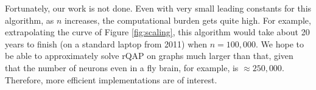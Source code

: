 \documentclass[10pt,journal,cspaper,compsoc]{IEEEtran}
\begin{document}
Fortunately, our work is not done. Even with very small leading constants for this algorithm, as $n$ increases, the computational burden gets quite high.  For example, extrapolating the curve of Figure \ref{fig:scaling}, this algorithm would take about 20 years to finish (on a standard laptop from 2011) when $n=100,000$.  We hope to be able to approximately solve rQAP on graphs much larger than that, given that the number of neurons even in a fly brain, for example, is $\approx 250,000$.  Therefore, more efficient implementations are of interest.  

\end{document}
